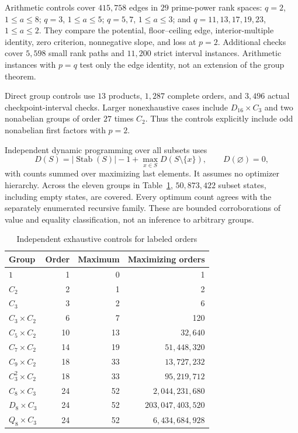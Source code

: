 \documentclass[11pt,letterpaper]{article}
\theoremstyle{definition}
\newcommand{\Stab}{\operatorname{Stab}}
\begin{document}
Arithmetic controls cover $415{,}758$ edges in $29$ prime-power rank spaces: $q=2$, $1\le a\le8$; $q=3$, $1\le a\le5$; $q=5,7$, $1\le a\le3$; and $q=11,13,17,19,23$, $1\le a\le2$. They compare the potential, floor--ceiling edge, interior-multiple identity, zero criterion, nonnegative slope, and loss at $p=2$. Additional checks cover $5{,}598$ small rank paths and $11{,}200$ strict interval instances. Arithmetic instances with $p=q$ test only the edge identity, not an extension of the group theorem.

Direct group controls use $13$ products, $1{,}287$ complete orders, and $3{,}496$ actual checkpoint-interval checks. Larger nonexhaustive cases include $D_{16}\times C_3$ and two nonabelian groups of order $27$ times $C_2$. Thus the controls explicitly include odd nonabelian first factors with $p=2$.

Independent dynamic programming over all subsets uses
\[
D(S)=|\Stab(S)|-1+\max_{x\in S}D(S\setminus\{x\}),\qquad D(\varnothing)=0,
\]
with counts summed over maximizing last elements. It assumes no optimizer hierarchy. Across the eleven groups in Table~\ref{tab:controls}, $50{,}873{,}422$ subset states, including empty states, are covered. Every optimum count agrees with the separately enumerated recursive family. These are bounded corroborations of value and equality classification, not an inference to arbitrary groups.

\begin{table}[htbp]
\centering
\caption{Independent exhaustive controls for labeled orders}\label{tab:controls}
\begin{tabular}{lrrr}
\toprule
Group & Order & Maximum & Maximizing orders\\
\midrule
$1$ & 1 & 0 & 1\\
$C_2$ & 2 & 1 & 2\\
$C_3$ & 3 & 2 & 6\\
$C_3\times C_2$ & 6 & 7 & 120\\
$C_5\times C_2$ & 10 & 13 & $32{,}640$\\
$C_7\times C_2$ & 14 & 19 & $51{,}448{,}320$\\
$C_9\times C_2$ & 18 & 33 & $13{,}727{,}232$\\
$C_3^2\times C_2$ & 18 & 33 & $95{,}219{,}712$\\
$C_8\times C_3$ & 24 & 52 & $2{,}044{,}231{,}680$\\
$D_8\times C_3$ & 24 & 52 & $203{,}047{,}403{,}520$\\
$Q_8\times C_3$ & 24 & 52 & $6{,}434{,}684{,}928$\\
\bottomrule
\end{tabular}
\end{table}
\end{document}
